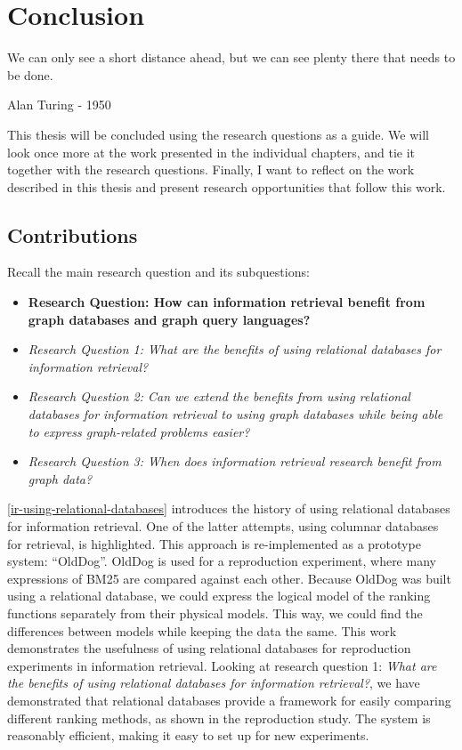 \chapter{Conclusion}
\label{conclusion}
\epigraph{We can only see a short distance ahead, but we can see plenty there that needs to be done.}{Alan Turing - 1950}

 This thesis will be concluded using the research questions as a guide. We will look once more at the work presented in the individual chapters, and tie it together with the research questions. Finally, I want to reflect on the work described in this thesis and present research opportunities that follow this work.

\section{Contributions}
Recall the main research question and its subquestions:
\begin{itemize}
	\item \textbf{Research Question: How can information retrieval benefit from graph databases and graph query languages?}
	\item \emph{Research Question 1: What are the benefits of using relational databases for information retrieval?} 
	\item \emph{Research Question 2: Can we extend the benefits from using relational databases for information retrieval to using graph databases while being able to express graph-related problems easier?} 
	\item \emph{Research Question 3: When does information retrieval research benefit from graph data?} 
\end{itemize}

\cref{ir-using-relational-databases} introduces the history of using relational databases for information retrieval. One of the latter attempts, using columnar databases for retrieval, is highlighted. This approach is re-implemented as a prototype system: ``OldDog''. OldDog is used for a reproduction experiment, where many expressions of BM25 are compared against each other. Because OldDog was built using a relational database, we could express the logical model of the ranking functions separately from their physical models. This way, we could find the differences between models while keeping the data the same. This work demonstrates the usefulness of using relational databases for reproduction experiments in information retrieval. Looking at research question 1: \emph{What are the benefits of using relational databases for information retrieval?}, we have demonstrated that relational databases provide a framework for easily comparing different ranking methods, as shown in the reproduction study. The system is reasonably efficient, making it easy to set up for new experiments. 

